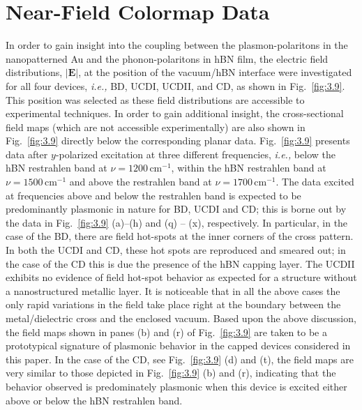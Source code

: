 \documentclass[preprint,
amsmath,amssymb,
aip,
jap,
floatfix,]{revtex4-2}
\begin{document}
		\section{Near-Field Colormap Data}
		\label{sec:NFAI}
				In order to gain insight into the coupling between the plasmon-polaritons in the nanopatterned Au and the phonon-polaritons in hBN film, the electric field distributions, $|\bm{E}|$, at the position of the vacuum/hBN interface were investigated for all four devices,  \textit{i.e.,} BD, UCDI, UCDII, and CD, as shown in Fig.~\ref{fig:3.9}. This position was selected as these field distributions are accessible to experimental techniques. In order to gain additional insight, the cross-sectional field maps (which are not accessible experimentally) are also shown in Fig.~\ref{fig:3.9} directly below the corresponding planar data. Fig.~\ref{fig:3.9} presents data after $y$-polarized excitation at three different frequencies, \textit{i.e.,} below the hBN restrahlen band at $\nu = 1200 \, \mathrm{cm}^{-1}$, within the hBN restrahlen band at $\nu = 1500 \, \mathrm{cm}^{-1}$ and above the restrahlen band at $\nu = 1700 \, \mathrm{cm}^{-1}$. The data excited at frequencies above and below the restrahlen band is expected to be predominantly plasmonic in nature for   BD, UCDI and CD; this is borne out by the data in Fig.~\ref{fig:3.9} (a)--(h) and (q) -- (x), respectively. In particular, in the case of the BD, there are field hot-spots at the inner corners of the cross pattern. In both the UCDI and CD, these hot spots are reproduced and smeared out; in the case of the CD this is due the presence of the  hBN capping layer. The UCDII exhibits no evidence of field hot-spot behavior as expected for a structure without a nanostructured metallic layer. It is noticeable that in all the above cases the only rapid variations in the field take place right at the boundary between the metal/dielectric cross and the enclosed vacuum. Based upon the above discussion, the field maps shown in panes (b) and (r) of Fig.~\ref{fig:3.9} are taken to be a prototypical signature of plasmonic behavior in the capped devices considered in this paper. In the case of the CD, see Fig.~\ref{fig:3.9} (d) and (t), the field maps are very similar to those depicted in Fig.~\ref{fig:3.9} (b) and (r), indicating that the behavior observed is predominately plasmonic when this device is excited either above or below the hBN restrahlen band.
\end{document}
